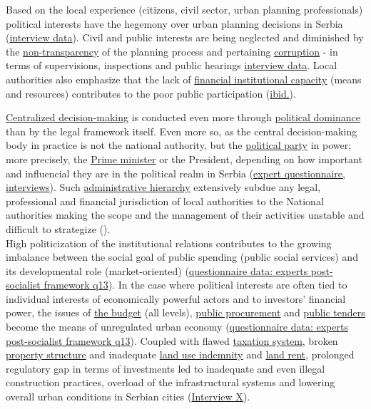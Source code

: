 \documentclass[11pt]{report}
\begin{document}
\begin{itemize}
Based on the local experience (citizens, civil sector, urban planning professionals) political interests have the hegemony over urban planning decisions in Serbia (\href{ref}{interview data}).
Civil and public interests are being neglected and diminished by the \underline{non-transparency} of the planning process and pertaining \underline{corruption} - in terms of supervisions, inspections and public hearings \href{ref}{interview data}.
\href{ref}{\citealt{ministarstvo_prostora_urbani_2014}}
Local authorities also emphasize that the lack of \underline{financial institutional capacity} (means and resources) contributes to the poor public participation (\href{ref}{ibid.}).

\underline{Centralized decision-making} is conducted even more through \underline{political dominance} than by the legal framework itself.
Even more so, as the central decision-making body in practice is not the national authority, but the  \underline{political party} in power;
more precisely, the  \underline{Prime minister} or the President, depending on how important and influencial they are in the political realm in Serbia (\href{ref}{expert questionnaire, interviews}).
Such \underline{administrative hierarchy} extensively subdue any legal, professional and financial jurisdiction of local authorities to the National authorities making the scope and the management of their activities unstable and difficult to strategize (\cite{Novi evropski regionalizam 2}).
\\
High politicization of the institutional relations contributes to the growing imbalance between the social goal of public spending (public social services) and its developmental role (market-oriented) (\href{ref}{questionnaire data: experts post-socialist framework q13}).
In the case where political interests are often tied to individual interests of economically powerful actors and to investors' financial power, the issues of \underline{the budget} (all levels), \underline{public procurement} and \underline{public tenders} become the means of unregulated urban economy (\href{ref}{questionnaire data: experts post-socialist framework q13}).
Coupled with flawed \underline{taxation system}, broken \underline{property structure} and inadequate \underline{land use indemnity} and \underline{land rent}, prolonged regulatory gap in terms of investments led to inadequate and even illegal construction practices, overload of the infrastructural systems and lowering overall urban conditions in Serbian cities (\href{InterviewX}{Interview X}).


\end{itemize}
\end{document}
